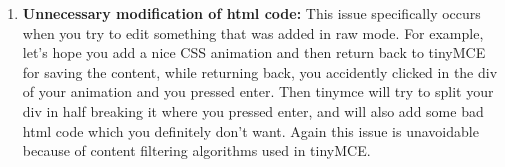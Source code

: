 \begin{enumerate}
\item\textbf{Unnecessary modification of html code:}\newline\newline
This issue specifically occurs when you try to edit something that was added in raw
mode. For example, let’s hope you add a nice CSS animation and then return back to
tinyMCE for saving the content, while returning back, you accidently clicked in the
div of your animation and you pressed enter. Then tinymce will try to split your div
in half breaking it where you pressed enter, and will also add some bad html code
which you definitely don’t want. Again this issue is unavoidable because of content
filtering algorithms used in tinyMCE.
\end{enumerate}

